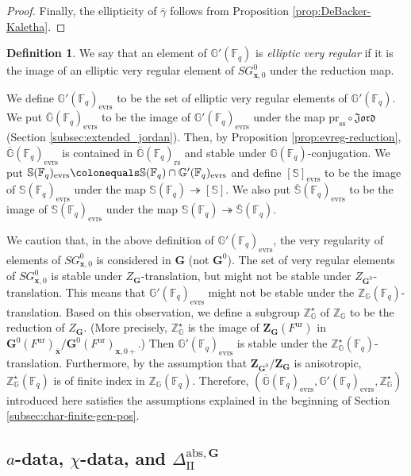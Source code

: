 \documentclass{amsart}
\newcommand{\abs}{\mathrm{abs}}
\newcommand{\evrs}{\mathrm{evrs}}
\newcommand{\pr}{\mathrm{pr}}
\newcommand{\rs}{\mathrm{rs}}
\renewcommand{\ss}{\mathrm{ss}}
\newcommand{\ur}{\mathrm{ur}}
\newcommand{\Jord}{\mathfrak{Jord}}
\newcommand{\x}{\mathbf{x}}
\newcommand{\F}{\mathbb{F}}
\newcommand{\FF}{\mathbb{F}}
\newcommand{\bbS}{\mathbb{S}}
\newcommand{\bbG}{\mathbb{G}}
\newcommand{\bfG}{\mathbf{G}}
\newcommand{\bbZ}{\mathbb{Z}}
\newcommand{\bfZ}{\mathbf{Z}}
\newcommand{\II}{\mathrm{II}}
\theoremstyle{plain}
\theoremstyle{definition}
\newtheorem{defn}[thm]{Definition}
\theoremstyle{remark}
\theoremstyle{theorem}
\begin{document}
\begin{proof}
Finally, the ellipticity of $\overline{\gamma}$ follows from Proposition \ref{prop:DeBacker-Kaletha}.
\end{proof}

\begin{defn}\label{defn:evrs-finite-fields}
We say that an element of $\bbG'(\F_{q})$ is \textit{elliptic very regular} if it is the image of an elliptic very regular element of $SG^{0}_{\x,0}$ under the reduction map.
\end{defn}

We define $\bbG'(\F_{q})_{\evrs}$ to be the set of elliptic very regular elements of $\bbG'(\F_{q})$.
We put $\overline{\bbG}(\F_{q})_{\evrs}$ to be the image of $\bbG'(\FF_q)_{\evrs}$ under the map $\pr_{\ss}\circ\Jord$ (Section \ref{subsec:extended_jordan}). 
Then, by Proposition \ref{prop:evreg-reduction}, $\overline{\bbG}(\F_{q})_{\evrs}$ is contained in $\overline{\bbG}(\F_{q})_{\rs}$ and stable under $\bbG(\F_{q})$-conjugation.
We put $\bbS(\F_{q})_{\evrs}\colonequals \bbS(\F_{q})\cap\bbG'(\F_{q})_{\evrs}$ and define $[\bbS]_{\evrs}$ to be the image of $\bbS(\F_{q})_{\evrs}$ under the map $\bbS(\F_{q})\twoheadrightarrow[\bbS]$.
We also put $\overline{\bbS}(\F_{q})_{\evrs}$ to be the image of $\bbS(\F_{q})_{\evrs}$ under the map $\bbS(\F_{q})\twoheadrightarrow\overline{\bbS}(\F_{q})$.

We caution that, in the above definition of $\bbG'(\F_{q})_{\evrs}$, the very regularity of elements of $SG^{0}_{\x,0}$ is considered in $\bfG$ (not $\bfG^{0}$).
The set of very regular elements of $SG^{0}_{\x,0}$ is stable under $Z_{\bfG}$-translation, but might not be stable under $Z_{\bfG^{0}}$-translation.
This means that $\bbG'(\F_{q})_{\evrs}$ might not be stable under the $\bbZ_{\bbG}(\F_{q})$-translation.
Based on this observation, we define a subgroup $\bbZ^{\star}_{\bbG}$ of $\bbZ_{\bbG}$ to be the reduction of $Z_{\bfG}$.
(More precisely, $\bbZ^{\star}_{\bbG}$ is the image of $\bfZ_{\bfG}(F^{\ur})$ in $\bfG^{0}(F^{\ur})_{\bar{\x}}/\bfG^{0}(F^{\ur})_{\x,0+}$.)
Then $\bbG'(\F_{q})_{\evrs}$ is stable under the $\bbZ^{\star}_{\bbG}(\F_{q})$-translation.
Furthermore, by the assumption that $\bfZ_{\bfG^{0}}/\bfZ_{\bfG}$ is anisotropic, $\bbZ^{\star}_{\bbG}(\F_{q})$ is of finite index in $\bbZ_{\bbG}(\F_{q})$.
Therefore, $(\overline{\bbG}(\F_{q})_{\evrs}, \bbG'(\F_{q})_{\evrs}, \bbZ^{\star}_{\bbG})$ introduced here satisfies the assumptions explained in the beginning of Section \ref{subsec:char-finite-gen-pos}.


\subsection{$a$-data, $\chi$-data, and $\Delta_{\II}^{\abs,\bfG}$}\label{subsec:tran}
\end{document}
